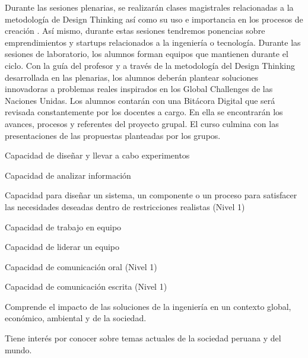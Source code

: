 \begin{syllabus}


\begin{justification}
Durante las sesiones plenarias, se realizarán clases magistrales relacionadas a la metodología de Design Thinking así como su uso e importancia en los procesos de creación . Así mismo, durante estas sesiones tendremos ponencias sobre emprendimientos y startups relacionados a la ingeniería o tecnología.
Durante las sesiones de laboratorio, los alumnos forman equipos que mantienen durante el ciclo. Con la guía del profesor y a través de la metodología del Design Thinking desarrollada en las plenarias, los alumnos deberán plantear soluciones innovadoras a problemas reales inspirados en los Global Challenges de las Naciones Unidas.
Los alumnos contarán con una Bitácora Digital que será revisada constantemente por los docentes a cargo. En ella se encontrarán los avances, procesos y referentes del proyecto grupal. El curso culmina con las presentaciones de las propuestas planteadas por los grupos.
\end{justification}

\begin{goals}
\item Capacidad de diseñar y llevar a cabo experimentos 
\item Capacidad de analizar información
\item Capacidad para diseñar un sistema, un componente o un proceso para satisfacer las necesidades deseadas dentro de restricciones realistas (Nivel 1)
\item Capacidad de trabajo en equipo
\item Capacidad de liderar un equipo
\item Capacidad de comunicación oral (Nivel 1)
\item Capacidad de comunicación escrita (Nivel 1)
\item Comprende el impacto de las soluciones de la ingeniería en un contexto global, económico, ambiental y de la sociedad.
\item Tiene interés por conocer sobre temas actuales de la sociedad peruana y del mundo.
\end{goals}

\begin{outcomes}
\end{outcomes}


\end{syllabus}
